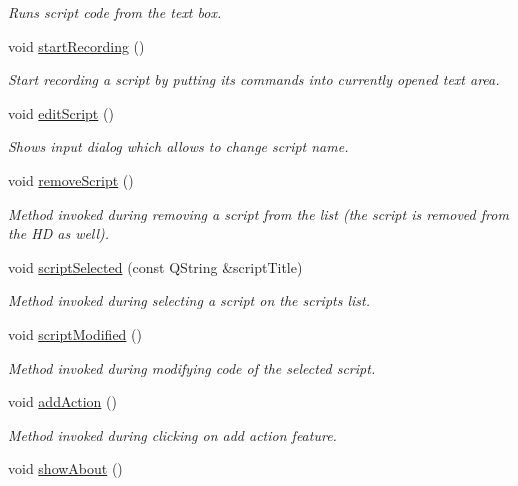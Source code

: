 \begin{DoxyCompactItemize}
\begin{DoxyCompactList}\small\item\em Runs script code from the text box. \end{DoxyCompactList}\item 
void \hyperlink{classmain_win_a3e182f4de7064102158f46c818d4c4bd}{start\-Recording} ()
\begin{DoxyCompactList}\small\item\em Start recording a script by putting its commands into currently opened text area. \end{DoxyCompactList}\item 
void \hyperlink{classmain_win_aa720b13b10d81cfe3fb13a6d6df375fb}{edit\-Script} ()
\begin{DoxyCompactList}\small\item\em Shows input dialog which allows to change script name. \end{DoxyCompactList}\item 
void \hyperlink{classmain_win_a3ad8d9509ece99d6e322db2d56a9fa51}{remove\-Script} ()
\begin{DoxyCompactList}\small\item\em Method invoked during removing a script from the list (the script is removed from the H\-D as well). \end{DoxyCompactList}\item 
void \hyperlink{classmain_win_af5eb5f12f6e8bf37e9a293e28d82632c}{script\-Selected} (const Q\-String \&script\-Title)
\begin{DoxyCompactList}\small\item\em Method invoked during selecting a script on the scripts list. \end{DoxyCompactList}\item 
void \hyperlink{classmain_win_affa3129c6021871bfc6ab5acccb0a9c5}{script\-Modified} ()
\begin{DoxyCompactList}\small\item\em Method invoked during modifying code of the selected script. \end{DoxyCompactList}\item 
void \hyperlink{classmain_win_abfe17be5efdd261fa5d73c37c66b57e8}{add\-Action} ()
\begin{DoxyCompactList}\small\item\em Method invoked during clicking on add action feature. \end{DoxyCompactList}\item 
void \hyperlink{classmain_win_a971bee9dff02167121566f9a4444af4e}{show\-About} ()

\end{DoxyCompactItemize}
